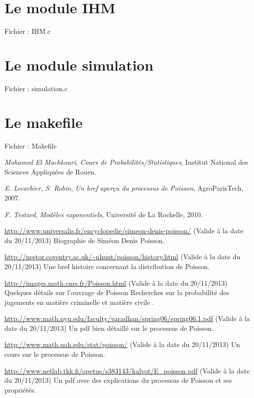 \documentclass[a4paper, titlepage]{livret} %
\begin{document}
			

		\section{Le module IHM}
			Fichier : IHM.c
	
			

		\section{Le module simulation}
			Fichier : simulation.c
	
			
	
		\section{Le makefile}
			Fichier : Makefile
			\lstset{language=make} 
		
			
	
	\begin{thebibliography}{9}
	
			\emph{Mohamed El Machkouri},
			\textit{Cours de Probabilités/Statistiques},
			Institut National des Sciences Appliquées de Rouen.
	
			\emph{E. Lecarbier, S. Robin},
			\textit{Un bref aperçu du processus de Poisson},
			AgroParisTech, 2007.

			\emph{F. Testard},
			\textit{Modèles exponentiels},
			Université de La Rochelle, 2010.

			\url{http://www.universalis.fr/encyclopedie/simeon-denis-poisson/}
			(Valide à la date du 20/11/2013)
			Biographie de Siméon Denis Poisson.

			\url{http://nestor.coventry.ac.uk/~nhunt/poisson/history.html}
			(Valide à la date du 20/11/2013)
			Une bref histoire concernant la distribution de Poisson.

			\url{http://images.math.cnrs.fr/Poisson.html}
			(Valide à la date du 20/11/2013)
			Quelques détails sur l'ouvrage de Poisson \og Recherches sur la probabilité des jugements en matière criminelle et matière civile \fg.

			\url{http://www.math.nyu.edu/faculty/varadhan/spring06/spring06.1.pdf}
			(Valide à la date du 20/11/2013)
			Un pdf bien détaillé sur le processus de Poisson.

			\url{http://www.math.uah.edu/stat/poisson/}
			(Valide à la date du 20/11/2013)
			Un cours sur le processus de Poisson.

			\url{http://www.netlab.tkk.fi/opetus/s383143/kalvot/E_poisson.pdf}
			(Valide à la date du 20/11/2013)
			Un pdf avec des explications du processus de Poisson et ses propriétés.
	
	
	\end{thebibliography}
\end{document}
